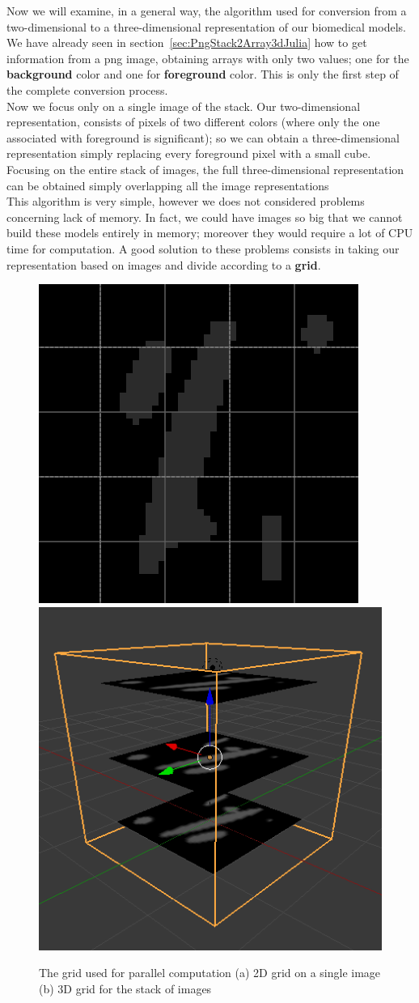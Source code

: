 \documentclass[11pt,oneside]{article}	%
\begin{document}
Now we will examine, in a general way, the algorithm used for conversion from a two-dimensional to a three-dimensional representation of our biomedical models.\\
We have already seen in section~\ref{sec:PngStack2Array3dJulia} how to get information from a png image, obtaining arrays with only two values; one for the \textbf{background} color and one for \textbf{foreground} color. This is only the first step of the complete conversion process.\\

Now we focus only on a single image of the stack. Our two-dimensional representation, consists of pixels of two different colors (where only the one associated with foreground is significant); so we can obtain a three-dimensional representation simply replacing every foreground pixel with a small cube. Focusing on the entire stack of images, the full three-dimensional representation can be obtained simply overlapping all the image representations\\

This algorithm is very simple, however we does not considered problems concerning lack of memory. In fact, we could have images so big that we cannot build these models entirely in memory; moreover they would require a lot of CPU time for computation. A good solution to these problems consists in taking our representation based on images and divide according to a \textbf{grid}.\\

\begin{figure}[htb] %
   \centering
   \includegraphics[width=0.45\linewidth]{images/imageGrid.png} \hfill
   \includegraphics[width=0.45\linewidth]{images/imageGrid3d.png}
   \caption{The grid used for parallel computation (a) 2D grid on a single image (b) 3D grid for the stack of images}
   \label{fig:grid}
\end{figure}
\end{document}
